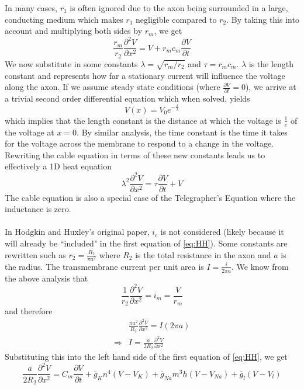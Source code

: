 \documentclass{article}
\newcommand{\pd}[2]{\frac{\partial #1}{\partial #2}}
\newcommand{\pdt}[2]{\frac{\partial ^2 #1}{\partial #2 ^2}}
\numberwithin{equation}{section}
\begin{document}
In many cases, $r_1$ is often ignored due to the axon being surrounded in a large, conducting medium which makes $r_1$ negligible compared to $r_2$. By taking this into account and multiplying both sides by $r_m$, we get 
\begin{equation}
    \frac{r_m}{r_2}\pdt{V}{x} = V +r_mc_m\pd{V}{t}
\end{equation}
We now substitute in some constants $\lambda = \sqrt{r_m/r_2}$ and $\tau=r_mc_m$. $\lambda$ is the length constant and represents how far a stationary current will influence the voltage along the axon. If we assume steady state conditions (where $\pd{V}{t} = 0$), we arrive at a trivial second order differential equation which when solved, yields 
\begin{equation}
    V(x) = V_0 e^{-\frac{x}{\lambda}}
\end{equation}
which implies that the length constant is the distance at which the voltage is $\frac{1}{e}$ of the voltage at $x=0$. By similar analysis, the time constant is the time it takes for the voltage across the membrane to respond to a change in the voltage. Rewriting the cable equation in terms of these new constants leads us to effectively a 1D heat equation 
\begin{equation}
    \lambda^2\pdt{V}{x} = \tau \pd{V}{t} +V
\end{equation}
The cable equation is also a special case of the Telegrapher's Equation where the inductance is zero.\\\\
In Hodgkin and Huxley's original paper, $i_c$ is not considered (likely because it will already be ``included" in the first equation of \eqref{eq:HH}). Some constants are rewritten such as $r_2 = \frac{R_2}{\pi a^2}$ where $R_2$ is the total resistance in the axon and $a$ is the radius. The transmembrane current per unit area is $I= \frac{i}{2\pi a}$. We know from the above analysis that 
\begin{equation}
    \frac{1}{r_2}\pdt{V}{x} = i_m = \frac{V}{r_m}
\end{equation}
and therefore
\begin{equation}
\begin{split}
    &\frac{\pi a^2}{R_2}\pdt{V}{x} =I(2\pi a) \\
    \Rightarrow &I= \frac{a}{2R_2}\pdt{V}{x}
\end{split}
\end{equation}
Substituting this into the left hand side of the first equation of \eqref{eq:HH}, we get 
\begin{equation}
    \frac{a}{2R_2} \pdt{V}{x} = C_m\pd{V}{t} +\bar{g}_Kn^4(V-V_K) +\bar{g}_{Na}m^3h(V-V_{Na})+\bar{g}_l(V-V_l) 
\end{equation}
\end{document}
